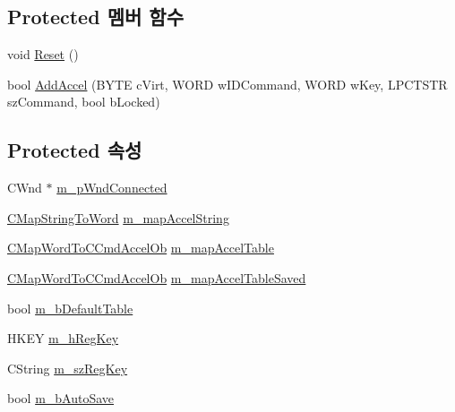 \subsection*{Protected 멤버 함수}
\begin{DoxyCompactItemize}
\item 
void \mbox{\hyperlink{class_c_accelerator_manager_aca456cda1a5f9b17bcfaea4f8ff45903}{Reset}} ()
\item 
bool \mbox{\hyperlink{class_c_accelerator_manager_ac9e0e988625c9687666a9f582f9b3536}{Add\+Accel}} (B\+Y\+TE c\+Virt, W\+O\+RD w\+I\+D\+Command, W\+O\+RD w\+Key, L\+P\+C\+T\+S\+TR sz\+Command, bool b\+Locked)
\end{DoxyCompactItemize}
\subsection*{Protected 속성}
\begin{DoxyCompactItemize}
\item 
C\+Wnd $\ast$ \mbox{\hyperlink{class_c_accelerator_manager_a24f706c75f754982051e1d7fad1916da}{m\+\_\+p\+Wnd\+Connected}}
\item 
\mbox{\hyperlink{_accelerator_manager_8h_a7e32d20f7fd6616d1dd9ea135a5cbbd2}{C\+Map\+String\+To\+Word}} \mbox{\hyperlink{class_c_accelerator_manager_abb40dbb1a44c47ac22590e8f1243835b}{m\+\_\+map\+Accel\+String}}
\item 
\mbox{\hyperlink{_accelerator_manager_8h_a8089a146b94f6314b9c45d955d18d052}{C\+Map\+Word\+To\+C\+Cmd\+Accel\+Ob}} \mbox{\hyperlink{class_c_accelerator_manager_a16b8d3e9328bc0eeeb048630deff2768}{m\+\_\+map\+Accel\+Table}}
\item 
\mbox{\hyperlink{_accelerator_manager_8h_a8089a146b94f6314b9c45d955d18d052}{C\+Map\+Word\+To\+C\+Cmd\+Accel\+Ob}} \mbox{\hyperlink{class_c_accelerator_manager_ad7c3ac9a16b8f19e0b5524d8582a5fae}{m\+\_\+map\+Accel\+Table\+Saved}}
\item 
bool \mbox{\hyperlink{class_c_accelerator_manager_ac563baf2a7cedb91bc44e9b8581a6020}{m\+\_\+b\+Default\+Table}}
\item 
H\+K\+EY \mbox{\hyperlink{class_c_accelerator_manager_a2652d64c947f7f3474b3aa054861b34b}{m\+\_\+h\+Reg\+Key}}
\item 
C\+String \mbox{\hyperlink{class_c_accelerator_manager_a03a6d0e43bcfb63cf1a23ad12cb5aa35}{m\+\_\+sz\+Reg\+Key}}
\item 
bool \mbox{\hyperlink{class_c_accelerator_manager_a37b504c74c13ca2d62eea8abffe73102}{m\+\_\+b\+Auto\+Save}}
\end{DoxyCompactItemize}
